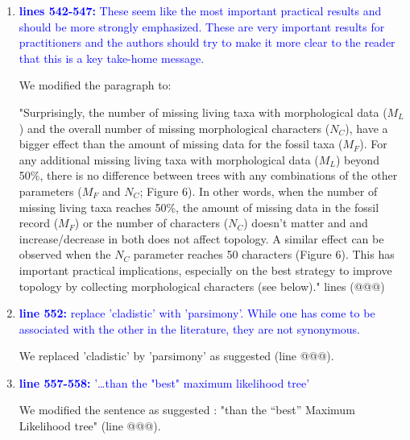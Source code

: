 \documentclass[12pt,letterpaper]{article}
\begin{document}
\begin{enumerate}
\item{\textcolor{blue}{\textbf{lines 542-547:} These seem like the most important practical results and should be more strongly emphasized. These are very important results for practitioners and the authors should try to make it more clear to the reader that this is a key take-home message.}}

We modified the paragraph to:

"Surprisingly, the number of missing living taxa with morphological data ($M_{L}$) and the overall number of missing morphological characters ($N_{C}$), have a bigger effect than the amount of missing data for the fossil taxa ($M_{F}$).
For any additional missing living taxa with morphological data ($M_L$) beyond 50\%, there is no difference between trees with any combinations of the other parameters ($M_F$ and $N_C$; Figure 6).
In other words, when the number of missing living taxa reaches 50\%, the amount of missing data in the fossil record ($M_F$) or the number of characters ($N_C$) doesn't matter and and increase/decrease in both does not affect topology.
A similar effect can be observed when the $N_C$ parameter reaches 50 characters (Figure 6).
This has important practical implications, especially on the best strategy to improve topology by collecting morphological characters (see below)." lines (@@@)


\item{\textcolor{blue}{\textbf{line 552:} replace 'cladistic' with 'parsimony'. While one has come to be associated with the other in the literature, they are not synonymous. }}

We replaced 'cladistic' by 'parsimony' as suggested (line @@@).

\item{\textcolor{blue}{\textbf{line 557-558:} '…than the "best" maximum likelihood tree'}}

We modified the sentence as suggested : "than the ``best'' Maximum Likelihood tree" (line @@@).


\end{enumerate}
\end{document}
